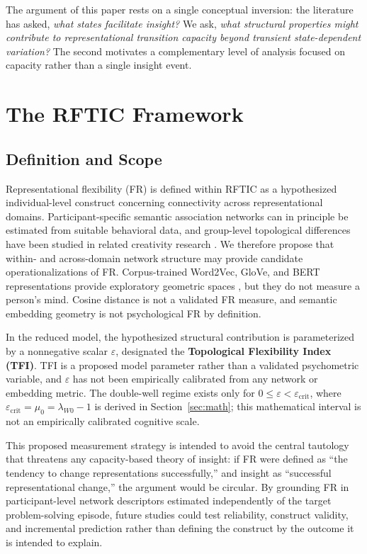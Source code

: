 \documentclass[a4paper,twocolumn,10pt]{article}
\newcommand{\eps}{\varepsilon}
\begin{document}
The argument of this paper rests on a single conceptual inversion: the literature has asked,
\emph{what states facilitate insight?} We ask, \emph{what structural properties might contribute
to representational transition capacity beyond transient state-dependent variation?} The second motivates a
complementary level of analysis focused on capacity rather than a single insight event.

\section{The RFTIC Framework}
\label{sec:framework}

\subsection{Definition and Scope}

Representational flexibility (FR) is defined within RFTIC as a hypothesized individual-level
construct concerning connectivity across representational domains. Participant-specific semantic
association networks can in principle be estimated from suitable behavioral data, and group-level
topological differences have been studied in related creativity research
\citep{kenett2014networks,zemla2018estimating}. We therefore propose that within- and across-domain
network structure may provide candidate operationalizations of FR. Corpus-trained Word2Vec, GloVe,
and BERT representations provide exploratory geometric spaces
\citep{mikolov2013distributed,pennington2014glove,devlin2019bert}, but they do not measure a
person's mind. Cosine distance is not a validated FR measure, and semantic embedding geometry is not
psychological FR by definition.

In the reduced model, the hypothesized structural contribution is parameterized by a nonnegative
scalar $\eps$, designated the \textbf{Topological Flexibility Index (TFI)}. TFI is a proposed model
parameter rather than a validated psychometric variable, and $\eps$ has not been empirically
calibrated from any network or embedding metric. The double-well regime exists only for
$0\leq\eps<\eps_{\mathrm{crit}}$, where
$\eps_{\mathrm{crit}}=\mu_0=\lambda_{W0}-1$ is derived in Section~\ref{sec:math}; this mathematical interval is not an empirically calibrated
cognitive scale.

This proposed measurement strategy is intended to avoid the central tautology that threatens any capacity-based theory
of insight: if FR were defined as ``the tendency to change representations successfully,'' and
insight as ``successful representational change,'' the argument would be circular. By grounding FR
in participant-level network descriptors estimated independently of the target problem-solving
episode, future studies could test reliability, construct validity, and incremental prediction rather
than defining the construct by the outcome it is intended to explain.
\end{document}
